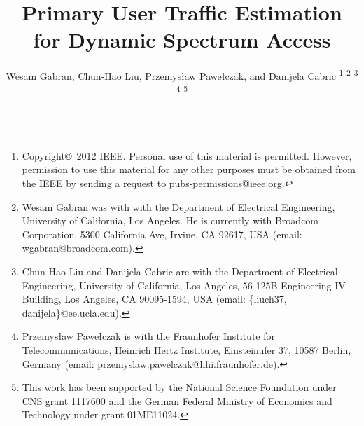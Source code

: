 \documentclass[11pt,draftclsnofoot,journal,onecolumn]{IEEEtran}
\begin{document}
\title{Primary User Traffic Estimation for Dynamic Spectrum Access}
\author{Wesam Gabran, Chun-Hao Liu, Przemys{\l}aw Pawe{\l}czak, and Danijela Cabric
\thanks{Copyright\copyright~2012 IEEE. Personal use of this material is permitted. However, permission to use this material for any other purposes must be obtained from the IEEE by sending a request to pubs-permissions@ieee.org.}
\thanks{Wesam Gabran was with with the Department of Electrical Engineering, University of California, Los Angeles. He is currently with Broadcom Corporation, 5300 California Ave, Irvine, CA 92617, USA (email: wgabran@broadcom.com).}
\thanks{Chun-Hao Liu and Danijela Cabric are with the Department of Electrical Engineering, University of California, Los Angeles, 56-125B Engineering IV Building, Los Angeles, CA 90095-1594, USA (email: \{liuch37, danijela\}@ee.ucla.edu).}
\thanks{Przemys{\l}aw Pawe{\l}czak is with the Fraunhofer Institute for Telecommunications, Heinrich Hertz Institute, Einsteinufer 37, 10587 Berlin, Germany (email: przemyslaw.pawelczak@hhi.fraunhofer.de).}
\thanks{This work has been supported by the National Science Foundation under CNS grant 1117600 and the German Federal Ministry of Economics and Technology under grant 01ME11024.}}

\maketitle
\end{document}

